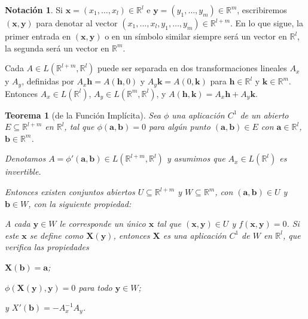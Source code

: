 \documentclass{report}
\newcommand{\realNumbers}{\mathbb{R}}
\newtheorem{theorem}{Teorema}
\theoremstyle{definition}
\newtheorem{notation}{Notación}
\theoremstyle{remark}
\begin{document}
  \begin{notation}
    Si \(\mathbf{x} = (x_1, \dots, x_l) \in \realNumbers^l\) e \(\mathbf{y} = (y_1, \dots, y_m) \in \realNumbers^m\), escribiremos \((\mathbf{x}, \mathbf{y})\) para denotar al vector \((x_1, \dots, x_l, y_1, \dots, y_m) \in \realNumbers^{l + m}\).
    En lo que sigue, la primer entrada en \((\mathbf{x}, \mathbf{y})\) o en un símbolo similar siempre será un vector en \(\realNumbers^l\), la segunda será un vector en \(\realNumbers^m\).

    Cada \(A \in L(\realNumbers^{l + m}, \realNumbers^l)\) puede ser separada en dos transformaciones lineales \(A_x\) y \(A_y\), definidas por \(A_x \mathbf{h} = A(\mathbf{h}, 0)\) y \(A_y \mathbf{k} = A(0, \mathbf{k})\) para \(\mathbf{h} \in \realNumbers^l\) y \(\mathbf{k} \in \realNumbers^m\).
    Entonces \(A_x \in L(\realNumbers^l)\), \(A_y \in L(\realNumbers^m, \realNumbers^l)\), y \(A(\mathbf{h}, \mathbf{k}) = A_x \mathbf{h} + A_y \mathbf{k}\).
  \end{notation}

  \begin{theorem}[de la Función Implícita]
    Sea \(\phi\) una aplicación \(C^1\) de un abierto \(E \subseteq \realNumbers^{l + m}\) en \(\realNumbers^l\), tal que \(\phi(\mathbf{a}, \mathbf{b}) = 0\) para algún punto \((\mathbf{a}, \mathbf{b}) \in E\) con \(\mathbf{a} \in \realNumbers^l\), \(\mathbf{b} \in \realNumbers^m\).

    Denotamos \(A = \phi'(\mathbf{a}, \mathbf{b}) \in L(\realNumbers^{l + m}, \realNumbers^l)\) y asumimos que \(A_x \in L(\realNumbers^l)\) es invertible.

    Entonces existen conjuntos abiertos \(U \subseteq \realNumbers^{l + m}\) y \(W \subseteq \realNumbers^m\), con \((\mathbf{a}, \mathbf{b}) \in U\) y \(\mathbf{b} \in W\), con la siguiente propiedad:

    A cada \(\mathbf{y} \in W\) le corresponde un único \(\mathbf{x}\) tal que \((\mathbf{x}, \mathbf{y}) \in U\) y \(f(\mathbf{x}, \mathbf{y}) = 0\).
    Si este \(\mathbf{x}\) se define como \(\mathbf{X}(\mathbf{y})\), entonces \(\mathbf{X}\) es una aplicación \(C^1\) de \(W\) en \(\realNumbers^l\), que verifica las propiedades
    \begin{enumerate*}
      \item \(\mathbf{X}(\mathbf{b}) = \mathbf{a}\);
      \item \(\phi(\mathbf{X}(\mathbf{y}), \mathbf{y}) = 0\) para todo \(\mathbf{y} \in W\);
      \item y \(X'(\mathbf{b}) = - A_x^{- 1} A_y\).
    \end{enumerate*}
  \end{theorem}
\end{document}

